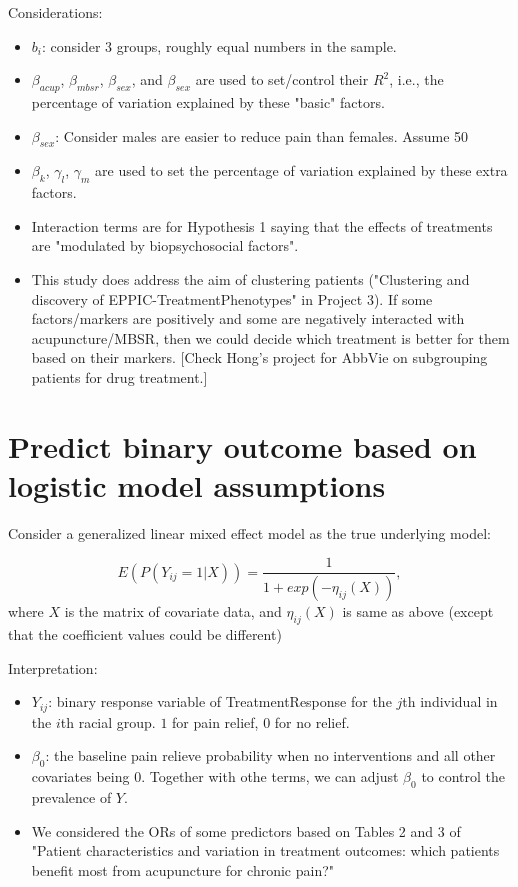 \documentclass[]{article}
\begin{document}
Considerations:

\begin{itemize}
\item $b_i$: consider 3 groups, roughly equal numbers in the sample.
\item $\beta_{acup}$, $\beta_{mbsr}$, $\beta_{sex}$, and $\beta_{sex}$ are used to set/control their $R^2$, i.e., the percentage of variation explained by these "basic" factors. 
\item $\beta_{sex}$: Consider males are easier to reduce pain than females. Assume 50%
\item $\beta_k$, $\gamma_l$, $\gamma_m$ are used to set the percentage of variation explained by these extra factors.

\item Interaction terms are for Hypothesis 1 saying that the effects of treatments are "modulated by biopsychosocial factors".  
\item This study does address the aim of clustering patients ("Clustering and discovery of EPPIC-TreatmentPhenotypes" in Project 3). If some factors/markers are positively and some are negatively interacted with acupuncture/MBSR, then we could decide which treatment is better for them based on their markers. [Check Hong's project for AbbVie on subgrouping patients for drug treatment.]  
\end{itemize}

\hypertarget{predict-binary-outcome-based-on-logistic-model-assumptions}{%
\section{Predict binary outcome based on logistic model
assumptions}\label{predict-binary-outcome-based-on-logistic-model-assumptions}}

Consider a generalized linear mixed effect model as the true underlying
model:

\[E(P(Y_{ij}=1|X)) = \frac{1}{1+exp(-\eta_{ij}(X))},\] where \(X\) is
the matrix of covariate data, and \(\eta_{ij}(X)\) is same as above
(except that the coefficient values could be different)

Interpretation:

\begin{itemize}
\item $Y_{ij}$: binary response variable of TreatmentResponse for the $j$th individual in the $i$th racial group. $1$ for pain relief, $0$ for no relief. 
\item $\beta_0$: the baseline pain relieve probability when no interventions and all other covariates being 0. Together with othe terms, we can adjust $\beta_0$ to control the prevalence of $Y$.  
\item We considered the ORs of some predictors based on Tables 2 and 3 of \cite{witt2011patient} "Patient characteristics and variation in treatment outcomes: which patients benefit most from acupuncture for chronic pain?"
\end{itemize}
\end{document}
